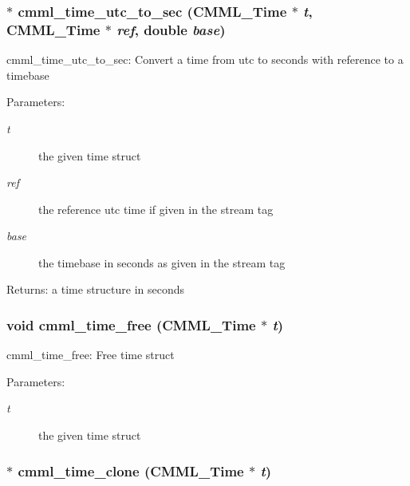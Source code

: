 \subsubsection{$\ast$ cmml\_\-time\_\-utc\_\-to\_\-sec ({\bf CMML\_\-Time} $\ast$ {\em t}, {\bf CMML\_\-Time} $\ast$ {\em ref}, double {\em base})}\label{cmml_8h_a102}


cmml\_\-time\_\-utc\_\-to\_\-sec: Convert a time from utc to seconds with reference to a timebase

\begin{Desc}
\item[Parameters:]
\begin{description}
\item[{\em t}]the given time struct \item[{\em ref}]the reference utc time if given in the stream tag \item[{\em base}]the timebase in seconds as given in the stream tag\end{description}
\end{Desc}
\begin{Desc}
\item[Returns:]a time structure in seconds \end{Desc}
\subsubsection{\setlength{\rightskip}{0pt plus 5cm}void cmml\_\-time\_\-free ({\bf CMML\_\-Time} $\ast$ {\em t})}\label{cmml_8h_a103}


cmml\_\-time\_\-free: Free time struct

\begin{Desc}
\item[Parameters:]
\begin{description}
\item[{\em t}]the given time struct \end{description}
\end{Desc}
\subsubsection{$\ast$ cmml\_\-time\_\-clone ({\bf CMML\_\-Time} $\ast$ {\em t})}\label{cmml_8h_a104}


